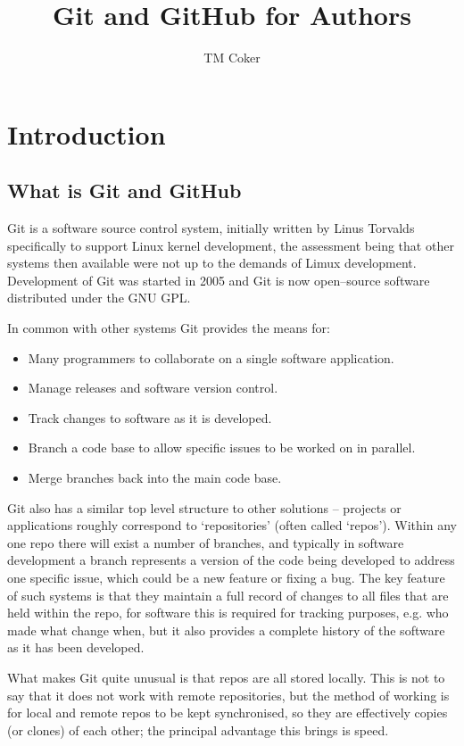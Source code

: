 \documentclass[a4paper, 12pt]{article}
\title{Git and GitHub for Authors}
\author{TM Coker}
\begin{document}
\maketitle
\section{Introduction}
\subsection{What is Git and GitHub}
\label{whatis}
Git is a software source control system, initially written by Linus Torvalds specifically to support Linux kernel development, the assessment being that other systems then available were not up to the demands of Limux development. Development of Git was started in 2005 and Git is now open--source software distributed under the GNU GPL.

In common with other systems Git provides the means for:
\begin{itemize}
\item Many programmers to collaborate on a single software application.
\item Manage releases and software version control.
\item Track changes to software as it is developed.
\item Branch a code base to allow specific issues to be worked on in parallel.
\item Merge branches back into the main code base.
\end{itemize}

Git also has a similar top level structure to other solutions -- projects or applications roughly correspond to `repositories' (often called `repos'). Within any one repo there will exist a number of branches, and typically in software development a branch represents a version of the code being developed to address one specific issue, which could be a new feature or fixing a bug. The key feature of such systems is that they maintain a full record of changes to all files that are held within the repo, for software this is required for tracking purposes, e.g. who made what change when, but it also provides a complete history of the software as it has been developed.

What makes Git quite unusual is that repos are all stored locally. This is not to say that it does not work with remote repositories, but the method of working is for local and remote repos to be kept synchronised, so they are effectively copies (or clones) of each other; the principal advantage this brings is speed.
\end{document}
